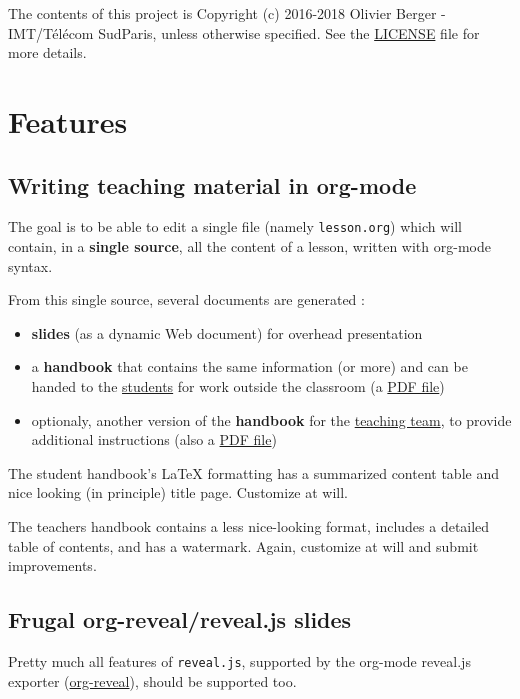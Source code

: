 \documentclass[a4paper]{article}
\begin{document}
The contents of this project is Copyright (c) 2016-2018 Olivier
Berger - IMT/Télécom SudParis, unless otherwise specified. See the
\url{LICENSE} file for more details.

\section{Features}
\label{sec:org900609d}
\subsection{Writing teaching material in org-mode}
\label{sec:orgcaec8ba}

The goal is to be able to edit a single file (namely \texttt{lesson.org})
which will contain, in a \textbf{single source}, all the content of a lesson,
written with org-mode syntax.

From this single source, several documents are generated :
\begin{itemize}
\item \textbf{slides} (as a dynamic Web document) for overhead presentation
\item a \textbf{handbook} that contains the same information (or more) and can be
handed to the \uline{students} for work outside the classroom (a \href{handbook.pdf}{PDF file})
\end{itemize}

\begin{itemize}
\item optionaly, another version of the \textbf{handbook} for the \uline{teaching team}, to provide additional instructions (also a \href{teacher-handbook.pdf}{PDF file})
\end{itemize}

\begin{NOTES}
The student handbook's \LaTeX{} formatting has a summarized content table and nice looking (in principle) title page. Customize at will.

The teachers handbook contains a less nice-looking format, includes a detailed table of contents, and has a watermark. Again, customize at will and submit improvements.
\end{NOTES}

\subsection{Frugal org-reveal/reveal.js slides}
\label{sec:org67b809a}

Pretty much all features of \texttt{reveal.js}, supported by the org-mode reveal.js exporter (\href{https://github.com/yjwen/org-reveal/}{org-reveal}), should be supported too.
\end{document}

